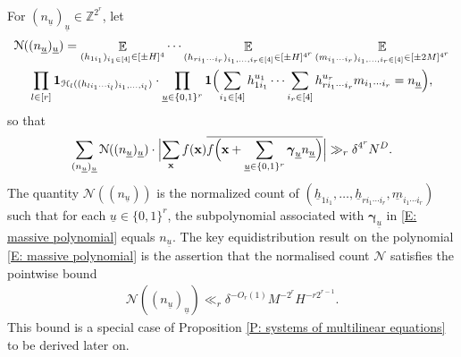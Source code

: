 \documentclass[11pt]{amsart}
\theoremstyle{definition}
\DeclareMathOperator*{\E}{\mathbb{E}}
\newcommand{\Z}{{\mathbb Z}}
\newcommand{\CH}{{\mathcal H}}
\newcommand{\CN}{{\mathcal N}}
\newcommand{\bx}{{\textbf{x}}}
\newcommand{\bgamma}{{\boldsymbol{\gamma}}}
\newcommand{\uh}{{\underline{h}}}
\newcommand{\um}{{\underline{m}}}
\newcommand{\uu}{{\underline{u}}}
\newcommand{\Bigabs}[1]{\Bigl| #1 \Bigr|}
\newcommand{\brac}[1]{\mathopen{}\left( #1 \mathclose{}\right)}
\newcommand{\Bigbrac}[1]{\Bigl( #1 \Bigr)}
\begin{document}
For $(n_\uu)_\uu\in\Z^{2^r}$, let
\begin{multline*}
    \CN((n_\uu)_{\uu}) = \E_{(h_{1i_1})_{i_1\in [4]}\in[\pm H]^4}
    \cdots \E_{(h_{ri_1\cdots i_r})_{i_1, \ldots, i_r\in [4]}\in[\pm H]^{4^r}}
    \E_{(m_{i_1\cdots  i_r})_{i_1, \ldots, i_r\in [4]}\in[\pm 2M]^{4^r}}\\ 
    \prod_{l\in[r]}\mathbf{1}_{\CH_l((h_{li_1\cdots i_l})_{i_1, \ldots, i_l})}\cdot \prod_{\uu\in\{0,1\}^{r}} \mathbf{1}\Bigbrac{\sum_{\substack{i_1\in [4]}}h_{1i_1}^{u_1}\cdots \sum_{\substack{i_r\in [4]}} h_{ri_1\cdots  i_r}^{u_{r}} m_{i_1\cdots  i_r} = n_\uu}, 
\end{multline*}
so that
\begin{align}\label{E: inserting K}
    \sum_{(n_\uu)_\uu}\CN((n_\uu)_\uu)\cdot\Bigabs{\sum_\bx f(\bx) \overline{f\Bigbrac{\bx + \sum_{\uu\in\{0,1\}^{r}}\bgamma_\uu n_\uu}}} \gg_r \delta^{4^r} N^D.
\end{align}
The quantity $\CN((n_\uu))$ is the normalized count of $\brac{\uh_{1i_1}, \ldots, \uh_{ri_1\cdots i_r}, \um_{i_1\cdots i_r}}$ such that for each $\uu\in\{0,1\}^{r}$, the subpolynomial associated with $\bgamma_\uu$ in \eqref{E: massive polynomial} equals $n_\uu$. The key equidistribution result on the polynomial \eqref{E: massive polynomial} is the assertion that the normalised count $\CN$ satisfies the pointwise bound
\begin{align}\label{E: pointwise bound on K}
    \CN((n_\uu)_\uu)\ll_r \delta^{-O_r(1)} M^{-2^r}H^{-r2^{r-1}}.
\end{align}
This bound is a special case of Proposition \ref{P: systems of multilinear equations} to be derived later on.
\end{document}
